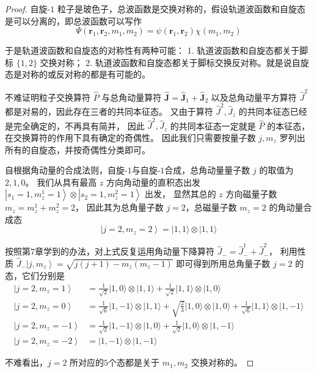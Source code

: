 \begin{proof}
自旋-$1$ 粒子是玻色子，总波函数是交换对称的，假设轨道波函数和自旋态是可以分离的，即总波函数可以写作
$$\Psi(\mathbf{r}_{1}, \mathbf{r}_{2}, m_{1}, m_{2})
=\psi(\mathbf{r}_{1}, \mathbf{r}_{2}) \chi(m_{1}, m_{2})$$

于是轨道波函数和自旋态的对称性有两种可能：
1. 轨道波函数和自旋态都关于脚标 $\{1,2\}$ 交换对称；
2. 轨道波函数和自旋态都关于脚标交换反对称。就是说自旋态是对称的或反对称的都是有可能的。

不难证明粒子交换算符 $\hat{P}$ 与总角动量算符 $\hat{\mathbf{J}}=\hat{\mathbf{J}}_{1}+\hat{\mathbf{J}}_{2}$ 
以及总角动量平方算符 $\hat{J}^{2}$ 都是对易的，因此存在三者的共同本征态。
又由于算符 $\hat{J}^{2}, \hat{J}_{z}$ 的共同本征态已经是完全确定的，不再具有简并，
因此 $\hat{J}^{2}, \hat{J}_{z}$ 的共同本征态一定就是 $\hat{P}$ 的本征态，在交换算符的作用下具有确定的奇偶性。
因此我们只需要按量子数 $j, m_{z}$ 罗列出所有的自旋态，并按奇偶性分类即可。

自根据角动量的合成法则，自旋-$1$与自旋-$1$合成，总角动量量子数 $j$ 的取值为 $2,1,0$。
我们从具有最高 $z$ 方向角动量的直积态出发 $\left|s_{1}=1, m_{z}^{1}=1\right\rangle \otimes\left|s_{2}=1, m_{z}^{2}=1\right\rangle$ 出发，
显然其总的 $z$ 方向磁量子数 $m_{z}=m_{z}^{1}+m_{z}^{2}=2$，
因此其为总角量子数 $j=2$，总磁量子数 $m_{z}=2$ 的角动量合成态
$$\left|j=2, m_{z}=2\right\rangle=|1,1\rangle \otimes|1,1\rangle$$

按照第7章学到的办法，对上式反复运用角动量下降算符 $\hat{J}_{-}=\hat{J}_{-}^{1}+\hat{J}_{-}^{2}$，
利用性质 $\hat{J}_{-}\left|j, m_{z}\right\rangle=\sqrt{j(j+1)-m_{z}(m_{z}-1)}$ 即可得到所用总角量子数 $j=2$ 的态，它们分别是
$$\begin{aligned}
\left|j=2, m_{z}=1\right\rangle & =\frac{1}{\sqrt{2}}|1,0\rangle \otimes|1,1\rangle+\frac{1}{\sqrt{2}}|1,1\rangle \otimes|1,0\rangle \\
\left|j=2, m_{z}=0\right\rangle & =\frac{1}{\sqrt{6}}|1,-1\rangle \otimes|1,1\rangle+\sqrt{\frac{2}{3}}|1,0\rangle \otimes|1,0\rangle+\frac{1}{\sqrt{6}}|1,1\rangle \otimes|1,-1\rangle \\
\left|j=2, m_{z}=-1\right\rangle & =\frac{1}{\sqrt{2}}|1,-1\rangle \otimes|1,0\rangle+\frac{1}{\sqrt{2}}|1,0\rangle \otimes|1,-1\rangle \\
\left|j=2, m_{z}=-2\right\rangle & =|1,-1\rangle \otimes|1,-1\rangle
\end{aligned}$$

不难看出，$j=2$ 所对应的$5$个态都是关于 $m_{1}, m_{2}$ 交换对称的。


\end{proof}
